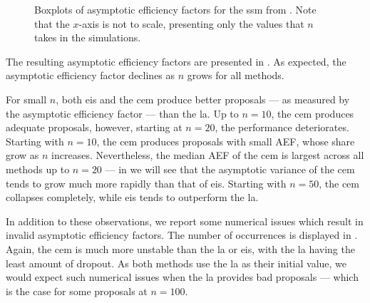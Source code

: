 \begin{figure}
    \centering

    \resizebox{\textwidth}{!}{%
    }
    \caption{Boxplots of asymptotic efficiency factors for the \gls{ssm} from . Note that the $x$-axis is not to scale, presenting only the values that $n$ takes in the simulations.} 
    \label{fig:ssm_comparison_efficiency_factor}
\end{figure} 


The resulting asymptotic efficiency factors are presented in . As expected, the asymptotic efficiency factor declines as $n$ grows for all methods. 

For small $n$, both \gls{eis} and the \gls{cem} produce better proposals --- as measured by the asymptotic efficiency factor --- than the \gls{la}. 
Up to $n=10$, the \gls{cem} produces adequate proposals, however, starting at $n=20$, the performance deteriorates. 
Starting with $n=10$, the \gls{cem} produces proposals with small AEF, whose share grow as $n$ increases.
Nevertheless, the median AEF of the \gls{cem} is largest across all methods up to $n=20$ --- in  we will see that the asymptotic variance of the \gls{cem} tends to grow much more rapidly than that of \gls{eis}. 
Starting with $n=50$, the \gls{cem} collapses completely, while \gls{eis} tends to outperform the \gls{la}.

\begin{table}
    \centering
    
    \label{tab:ssm_comparison_missing_values}
    \caption{Number of invalid asymptotic efficiency factors (out of $K=100$) per size $n$ and method. This includes cases where either the numerical scheme of the method failed to converge, or the proposal generated is numerically singular to the target.}
\end{table}

In addition to these observations, we report some numerical issues which result in invalid asymptotic efficiency factors. The number of occurrences is displayed in . Again, the \gls{cem} is much more unstable than the \gls{la} or \gls{eis}, with the \gls{la} having the least amount of dropout. As both methods use the \gls{la} as their initial value, we would expect such numerical issues when the \gls{la} provides bad proposals --- which is the case for some proposals at $n=100$.

